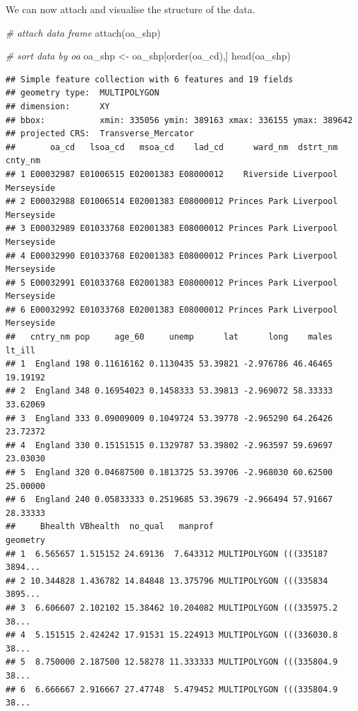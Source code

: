 \documentclass[
]{book}
\newenvironment{Shaded}{\begin{snugshade}}{\end{snugshade}}
\newcommand{\CommentTok}[1]{\textcolor[rgb]{0.56,0.35,0.01}{\textit{#1}}}
\newcommand{\FunctionTok}[1]{\textcolor[rgb]{0.00,0.00,0.00}{#1}}
\newcommand{\NormalTok}[1]{#1}
\newcommand{\OtherTok}[1]{\textcolor[rgb]{0.56,0.35,0.01}{#1}}
\begin{document}
We can now attach and visualise the structure of the data.

\begin{Shaded}
\begin{Highlighting}[]
\CommentTok{\# attach data frame}
\FunctionTok{attach}\NormalTok{(oa\_shp)}

\CommentTok{\# sort data by oa}
\NormalTok{oa\_shp }\OtherTok{\textless{}{-}}\NormalTok{ oa\_shp[}\FunctionTok{order}\NormalTok{(oa\_cd),]}
\FunctionTok{head}\NormalTok{(oa\_shp)}
\end{Highlighting}
\end{Shaded}

\begin{verbatim}
## Simple feature collection with 6 features and 19 fields
## geometry type:  MULTIPOLYGON
## dimension:      XY
## bbox:           xmin: 335056 ymin: 389163 xmax: 336155 ymax: 389642
## projected CRS:  Transverse_Mercator
##       oa_cd   lsoa_cd   msoa_cd    lad_cd      ward_nm  dstrt_nm    cnty_nm
## 1 E00032987 E01006515 E02001383 E08000012    Riverside Liverpool Merseyside
## 2 E00032988 E01006514 E02001383 E08000012 Princes Park Liverpool Merseyside
## 3 E00032989 E01033768 E02001383 E08000012 Princes Park Liverpool Merseyside
## 4 E00032990 E01033768 E02001383 E08000012 Princes Park Liverpool Merseyside
## 5 E00032991 E01033768 E02001383 E08000012 Princes Park Liverpool Merseyside
## 6 E00032992 E01033768 E02001383 E08000012 Princes Park Liverpool Merseyside
##   cntry_nm pop     age_60     unemp      lat      long    males   lt_ill
## 1  England 198 0.11616162 0.1130435 53.39821 -2.976786 46.46465 19.19192
## 2  England 348 0.16954023 0.1458333 53.39813 -2.969072 58.33333 33.62069
## 3  England 333 0.09009009 0.1049724 53.39778 -2.965290 64.26426 23.72372
## 4  England 330 0.15151515 0.1329787 53.39802 -2.963597 59.69697 23.03030
## 5  England 320 0.04687500 0.1813725 53.39706 -2.968030 60.62500 25.00000
## 6  England 240 0.05833333 0.2519685 53.39679 -2.966494 57.91667 28.33333
##     Bhealth VBhealth  no_qual   manprof                       geometry
## 1  6.565657 1.515152 24.69136  7.643312 MULTIPOLYGON (((335187 3894...
## 2 10.344828 1.436782 14.84848 13.375796 MULTIPOLYGON (((335834 3895...
## 3  6.606607 2.102102 15.38462 10.204082 MULTIPOLYGON (((335975.2 38...
## 4  5.151515 2.424242 17.91531 15.224913 MULTIPOLYGON (((336030.8 38...
## 5  8.750000 2.187500 12.58278 11.333333 MULTIPOLYGON (((335804.9 38...
## 6  6.666667 2.916667 27.47748  5.479452 MULTIPOLYGON (((335804.9 38...
\end{verbatim}
\end{document}
